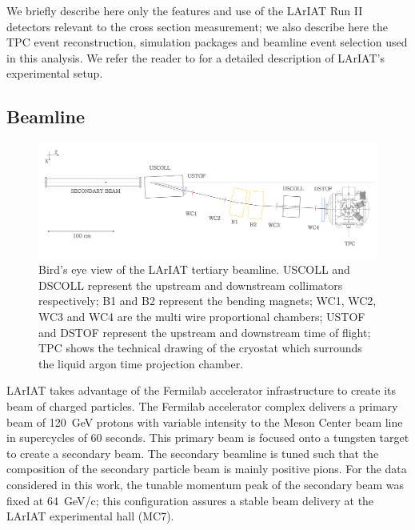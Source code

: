 \documentclass[aps,prl,twocolumn,showpacs,superscriptaddress,groupedaddress]{revtex4}  %
\begin{document}
We briefly describe here only the features and use of the LArIAT Run II  detectors  relevant to the cross section measurement; we also describe here the TPC event reconstruction, simulation packages and beamline event selection used in this analysis.  We refer the reader to \cite{LArIATDet} for a detailed description of LArIAT's experimental setup.

\subsection{\label{sec:Beamline}Beamline} 
\begin{figure}
\includegraphics[width=\textwidth,height=\textheight,keepaspectratio]{Tertiary.png}
\caption{Bird's eye view of the LArIAT tertiary beamline. USCOLL and DSCOLL represent the upstream and downstream collimators respectively; B1 and B2 represent the bending magnets; WC1, WC2, WC3 and WC4 are the multi wire proportional chambers; USTOF and DSTOF represent the upstream and downstream time of flight; TPC shows the technical drawing of the cryostat which surrounds the liquid argon time projection chamber.}
\label{fig:beamlinebird}
\end{figure}




LArIAT takes advantage of the Fermilab accelerator infrastructure to create its beam of charged particles.  The Fermilab accelerator complex  delivers a  primary beam of 120~GeV protons with variable intensity to the Meson Center beam line in supercycles of 60 seconds. This primary beam is focused onto a tungsten target to create a secondary beam. The secondary beamline is tuned such that the composition of the secondary particle beam is mainly positive pions. For the data considered in this work, the tunable momentum peak of the secondary beam was fixed at 64~GeV/c; this configuration assures a stable beam delivery at the LArIAT experimental hall (MC7).
\end{document}
